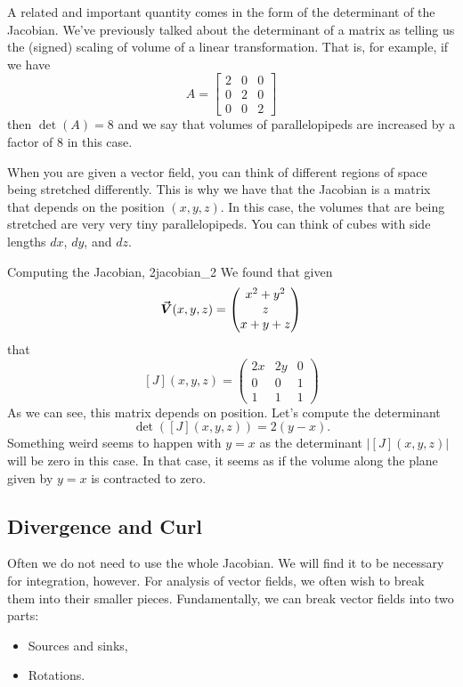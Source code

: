 		        A related and important quantity comes in the form of the determinant of the Jacobian.  We've previously talked about the determinant of a matrix as telling us the (signed) scaling of volume of a linear transformation.  That is, for example, if we have
		        \[
		        A = \begin{bmatrix} 2 & 0 & 0\\ 0 & 2 & 0\\ 0 & 0 & 2 \end{bmatrix}
		        \]
		        then $\det(A)=8$ and we say that volumes of parallelopipeds are increased by a factor of $8$ in this case.

		        When you are given a vector field, you can think of different regions of space being stretched differently.  This is why we have that the Jacobian is a matrix that depends on the position $(x,y,z)$.  In this case, the volumes that are being stretched are very very tiny parallelopipeds.  You can think of cubes with side lengths $dx$, $dy$, and $dz$.

		        \begin{ex}{Computing the Jacobian, 2}{jacobian_2}
		        We found that given
		        \[
		        \boldsymbol{\vec{V}}(x,y,z) = \begin{pmatrix} x^2+y^2 \\ z \\ x+y+z\end{pmatrix}
		        \]
		        that
		        \[
		        [J](x,y,z) = \begin{pmatrix} 2x & 2y & 0 \\ 0 & 0 & 1 \\ 1 & 1 & 1 \end{pmatrix}
		        \]
		        As we can see, this matrix depends on position.  Let's compute the determinant
		        \[
		        \det([J](x,y,z))=2(y-x).
		        \]
		        Something weird seems to happen with $y=x$ as the determinant $|[J](x,y,z)|$ will be zero in this case. In that case, it seems as if the volume along the plane given by $y=x$ is contracted to zero.
		        \end{ex}

		        \subsection{Divergence and Curl}
		        Often we do not need to use the whole Jacobian.  We will find it to be necessary for integration, however.  For analysis of vector fields, we often wish to break them into their smaller pieces.  Fundamentally, we can break vector fields into two parts:
		        \begin{itemize}
		            \item Sources and sinks,
		            \item Rotations.
		        \end{itemize}

